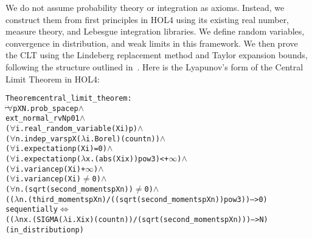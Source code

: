 We do not assume probability theory or integration as axioms. Instead, we construct them from first principles in HOL4 using its existing real number, measure theory, and Lebesgue integration libraries. We define random variables, convergence in distribution, and weak limits in this framework. We then prove the CLT using the Lindeberg replacement method and Taylor expansion bounds, following the structure outlined in~\cite{Chung:2001}.
Here is the Lyapunov's form of the Central Limit Theorem in HOL4:
\begin{hol}
  \begin{alltt}
    Theorem central_limit_theorem :
    \(\!\!\!{\turn}\!\!\!\!\) \(\forall\)p X N. prob_space p \(\land\)
    ext_normal_rv N p 0 1 \(\land\)
    (\(\forall\)i. real_random_variable (X i) p) \(\land\)
    (\(\forall\)n. indep_vars p X (\(\lambda\)i. Borel) (count n)) \(\land\)
    (\(\forall\)i. expectation p (X i) = 0) \(\land\)
    (\(\forall\)i. expectation p (\(\lambda\)x. (abs (X i x)) pow 3) < +\(\infty\)) \(\land\)
    (\(\forall\)i. variance p (X i) +\(\infty\)) \(\land\)
    (\(\forall\)i. variance p (X i) \(\ne\) 0) \(\land\)
    (\(\forall\)n. (sqrt (second_moments p X n)) \(\ne\) 0) \(\land\)
    ((\(\lambda\)n. (third_moments p X n) / ((sqrt (second_moments p X n)) pow 3)) --> 0)
    sequentially \({\Leftrightarrow}\)
    ((\(\lambda\)n x. (SIGMA (\(\lambda\)i. X i x) (count n)) / (sqrt (second_moments p X n))) --> N)
    (in_distribution p)
  \end{alltt}
\end{hol}





